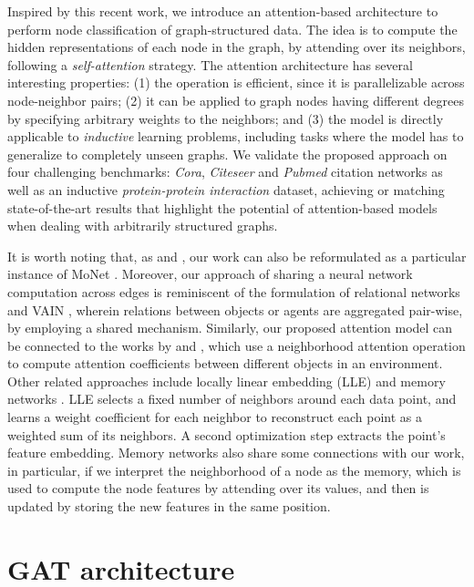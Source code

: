 \documentclass{article} \usepackage{iclr2018_conference,times}
\begin{document}
Inspired by this recent work, we introduce an attention-based architecture to perform node classification of graph-structured data. The idea is to compute the hidden representations of each node in the graph, by attending over its neighbors, following a \emph{self-attention} strategy. The attention architecture has several interesting properties: (1) the operation is efficient, since it is parallelizable across node-neighbor pairs; (2) it can be applied to graph nodes having different degrees by specifying arbitrary weights to the neighbors; and (3) the model is directly applicable to \emph{inductive} learning problems, including tasks where the model has to generalize to completely unseen graphs. We validate the proposed approach on four challenging benchmarks: \emph{Cora}, \emph{Citeseer} and \emph{Pubmed} citation networks as well as an inductive \emph{protein-protein interaction} dataset, achieving or matching state-of-the-art results that highlight the potential of attention-based models when dealing with arbitrarily structured graphs.

It is worth noting that, as \cite{kipf2016semi} and \cite{atwood2016diffusion}, our work can also be reformulated as a particular instance of MoNet \citep{monti2016geometric}. Moreover, our approach of sharing a neural network computation across edges is reminiscent of the formulation of relational networks \citep{santoro2017simple} and VAIN \citep{Hoshen17}, wherein relations between objects or agents are aggregated pair-wise, by employing a shared mechanism. Similarly, our proposed attention model can be connected to the works by \cite{duan2017one} and \cite{denil2017programmable}, which use a neighborhood attention operation to compute attention coefficients between different objects in an environment. Other related approaches include locally linear embedding (LLE) \citep{Roweis00nonlineardimensionality} and memory networks \citep{WestonCB14}. LLE selects a fixed number of neighbors around each data point, and learns a weight coefficient for each neighbor to reconstruct each point as a weighted sum of its neighbors. A second optimization step extracts the point's feature embedding. Memory networks also share some connections with our work, in particular, if we interpret the neighborhood of a node as the memory, which is used to compute the node features by attending over its values, and then is updated by storing the new features in the same position. 

\section{GAT architecture}
\label{headings}
\end{document}
